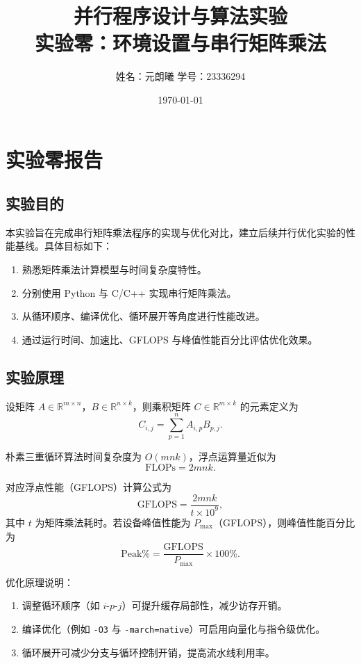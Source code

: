 \documentclass[12pt,a4paper]{ctexart}
\title{并行程序设计与算法实验\\实验零：环境设置与串行矩阵乘法}
\author{姓名：元朗曦 \quad 学号：23336294}
\date{\today}
\begin{document}
\maketitle

\section{实验零报告}

\subsection{实验目的}
本实验旨在完成串行矩阵乘法程序的实现与优化对比，建立后续并行优化实验的性能基线。具体目标如下：
\begin{enumerate}
  \item 熟悉矩阵乘法计算模型与时间复杂度特性。
  \item 分别使用 Python 与 C/C++ 实现串行矩阵乘法。
  \item 从循环顺序、编译优化、循环展开等角度进行性能改进。
  \item 通过运行时间、加速比、GFLOPS 与峰值性能百分比评估优化效果。
\end{enumerate}

\subsection{实验原理}
设矩阵 $A \in \mathbb{R}^{m\times n}$，$B \in \mathbb{R}^{n\times k}$，则乘积矩阵 $C \in \mathbb{R}^{m\times k}$ 的元素定义为
\begin{equation}
C_{i,j}=\sum_{p=1}^{n}A_{i,p}B_{p,j}.
\end{equation}

朴素三重循环算法时间复杂度为 $O(mnk)$，浮点运算量近似为
\begin{equation}
\text{FLOPs}=2mnk.
\end{equation}

对应浮点性能（GFLOPS）计算公式为
\begin{equation}
\text{GFLOPS}=\frac{2mnk}{t\times 10^9},
\end{equation}
其中 $t$ 为矩阵乘法耗时。若设备峰值性能为 $P_{\max}$（GFLOPS），则峰值性能百分比为
\begin{equation}
\text{Peak\%}=\frac{\text{GFLOPS}}{P_{\max}}\times 100\%.
\end{equation}

优化原理说明：
\begin{enumerate}
  \item 调整循环顺序（如 $i$-$p$-$j$）可提升缓存局部性，减少访存开销。
  \item 编译优化（例如 \texttt{-O3} 与 \texttt{-march=native}）可启用向量化与指令级优化。
  \item 循环展开可减少分支与循环控制开销，提高流水线利用率。
\end{enumerate}
\end{document}
